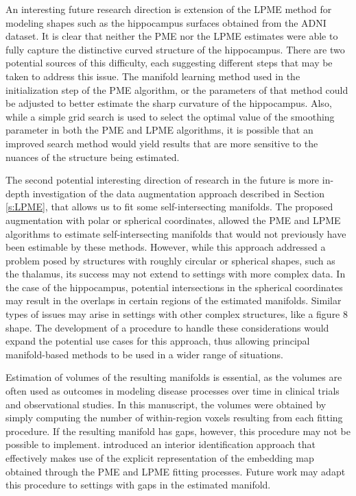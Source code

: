 \documentclass[11pt,reqno]{article}
\theoremstyle{definition}
\begin{document}
An interesting future research direction is extension of the LPME method for modeling  shapes such as the hippocampus surfaces obtained from the ADNI dataset. It is clear that neither the PME nor the LPME estimates were able to fully capture the distinctive curved structure of the hippocampus. There are two potential sources of this difficulty, each suggesting different steps that may be taken to address this issue. The manifold learning method used in the initialization step of the PME algorithm, or the parameters of that method could be adjusted to better estimate the sharp curvature of the hippocampus. Also, while a simple grid search is used to select the optimal value of the smoothing parameter in both the PME and LPME algorithms, it is possible that an improved search method would yield results that are more sensitive to the nuances of the structure being estimated. 

The second potential interesting direction of research in the future is more in-depth investigation of the data augmentation approach  described in Section \ref{s:LPME}, that allows us to fit some self-intersecting manifolds. The proposed augmentation with polar or spherical coordinates, allowed the PME and LPME algorithms to estimate self-intersecting manifolds that would not previously have been estimable by these methods. However, while this approach addressed a problem posed by structures with roughly circular or spherical shapes, such as the thalamus, its success may not extend to settings with more complex data. In the case of the hippocampus, potential intersections in the spherical coordinates may result in the overlaps in certain regions of the estimated manifolds. Similar types of issues may arise in settings with other complex structures, like a figure 8 shape. The development of a procedure to handle these considerations would expand the potential use cases for this approach, thus allowing principal manifold-based methods to be used in a wider range of situations.

Estimation of volumes of the resulting manifolds is essential, as the volumes are often used as outcomes in modeling disease processes over time in clinical trials and observational studies. In this manuscript, the volumes were obtained by simply computing the number of within-region voxels resulting from each fitting procedure. If the resulting manifold has gaps, however, this procedure may not be possible to implement. \cite{mengPrincipalManifoldEstimation2021} introduced an interior identification approach that effectively makes use of the explicit representation of the embedding map obtained through the PME and LPME fitting processes. Future work may adapt this procedure to settings with gaps in the estimated manifold.
\end{document}
